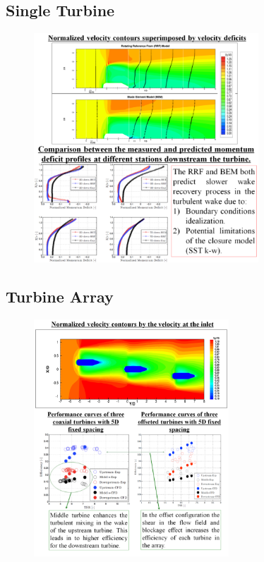 \documentclass[xcolor=x11names,compress]{beamer}
\begin{document}
\subsection{Single Turbine}
	
	\begin{frame}{}

		\begin{figure}[p]
		    \centering
		    \includegraphics[width=0.75\textwidth]{figures/validation-RANS-experiment_single-turbine_performance-and-wake-1.png}
		\end{figure}

	\end{frame}

\subsection{Turbine Array}
	
	\begin{frame}{}

		\begin{figure}[p]
		    \centering
		    \includegraphics[width=0.65\textwidth]{figures/validation-RANS-experiment_turbine-array_performance-and-wake-1.png}
		\end{figure}

	\end{frame}
\end{document}
